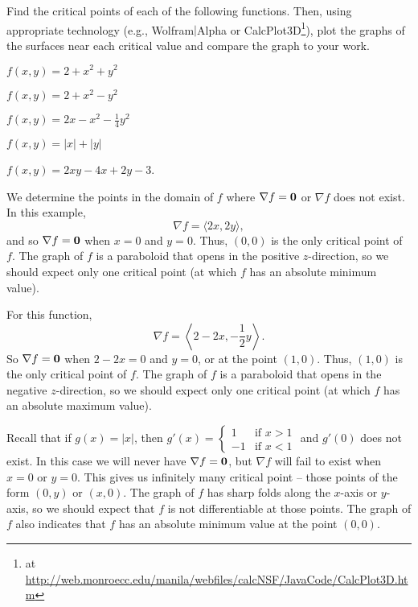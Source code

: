 \begin{activity} \label{A:10.7.3} Find the critical points of each of the
  following functions. Then, using appropriate technology (e.g.,
  Wolfram$|$Alpha or CalcPlot3D\footnote{at
    \url{http://web.monroecc.edu/manila/webfiles/calcNSF/JavaCode/CalcPlot3D.htm}}),
  plot the graphs of the surfaces near each critical value and compare the graph to your work.
   
	\ba
	\item $f(x,y) = 2+x^2+y^2$
	
	\item $f(x,y) = 2 + x^2 - y^2$
	
	\item $f(x,y) = 2x-x^2-\frac{1}{4}y^2$
	
	\item $f(x,y) = |x| + |y|$
	
        \item $f(x,y) = 2xy - 4x + 2y - 3$.
	
	

	\ea
\end{activity}
\begin{smallhint}

\end{smallhint}
\begin{bighint}

\end{bighint}
\begin{activitySolution}
\ba
\item We determine the points in the domain of $f$ where $\nabla f = \mathbf{0}$ or $\nabla f$ does not exist. In this example, 
\[\nabla f = \langle 2x, 2y \rangle,\]
and so $\nabla f = \mathbf{0}$ when $x = 0$ and $y = 0$. Thus, $(0,0)$ is the only critical point of $f$. The graph of $f$ is a paraboloid that opens in the positive $z$-direction, so we should expect only one critical point (at which $f$ has an absolute minimum value).

\item For this function,
\[\nabla f = \left\langle 2-2x, -\frac{1}{2}y \right\rangle.\]
So $\nabla f = \mathbf{0}$ when $2-2x = 0$ and $y = 0$, or at the point $(1,0)$. Thus, $(1,0)$ is the only critical point of $f$. The graph of $f$ is a paraboloid that opens in the negative $z$-direction, so we should expect only one critical point (at which $f$ has an absolute maximum value).

\item Recall that if $g(x) = |x|$, then $g'(x) = \begin{cases} 1 &\text{if } x > 1 \\ -1 &\text{if } x < 1 \end{cases}$ and $g'(0)$ does not exist. In this case we will never have $\nabla f = \mathbf{0}$, but $\nabla f$ will fail to exist when $x=0$ or $y=0$. This gives us infinitely many critical point -- those points of the form $(0,y)$ or $(x,0)$. The graph of $f$ has sharp folds along the $x$-axis or $y$-axis, so we should expect that $f$ is not differentiable at those points. The graph of $f$ also indicates that $f$ has an absolute minimum value at the point $(0,0)$. 
\ea
\end{activitySolution}
\aftera
